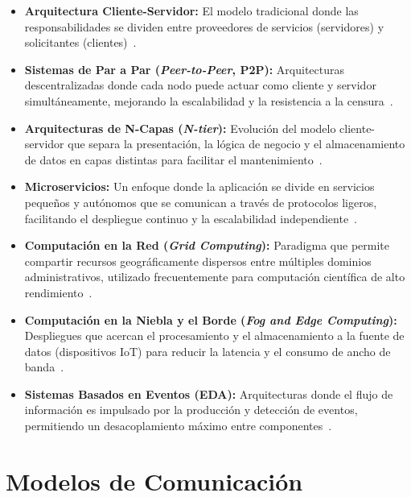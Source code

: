 \documentclass[12pt,a4paper]{article}
\begin{document}
\begin{itemize}
	\item \textbf{Arquitectura Cliente-Servidor:} El modelo tradicional donde las responsabilidades se dividen entre proveedores de servicios (servidores) y solicitantes (clientes)~\cite{r15}.

	\item \textbf{Sistemas de Par a Par (\textit{Peer-to-Peer}, P2P):} Arquitecturas descentralizadas donde cada nodo puede actuar como cliente y servidor simultáneamente, mejorando la escalabilidad y la resistencia a la censura~\cite{r15}.

	\item \textbf{Arquitecturas de N-Capas (\textit{N-tier}):} Evolución del modelo cliente-servidor que separa la presentación, la lógica de negocio y el almacenamiento de datos en capas distintas para facilitar el mantenimiento~\cite{r15}.

	\item \textbf{Microservicios:} Un enfoque donde la aplicación se divide en servicios pequeños y autónomos que se comunican a través de protocolos ligeros, facilitando el despliegue continuo y la escalabilidad independiente~\cite{r25}.

	\item \textbf{Computación en la Red (\textit{Grid Computing}):} Paradigma que permite compartir recursos geográficamente dispersos entre múltiples dominios administrativos, utilizado frecuentemente para computación científica de alto rendimiento~\cite{r26}.

	\item \textbf{Computación en la Niebla y el Borde (\textit{Fog and Edge Computing}):} Despliegues que acercan el procesamiento y el almacenamiento a la fuente de datos (dispositivos IoT) para reducir la latencia y el consumo de ancho de banda~\cite{r27}.

	\item \textbf{Sistemas Basados en Eventos (EDA):} Arquitecturas donde el flujo de información es impulsado por la producción y detección de eventos, permitiendo un desacoplamiento máximo entre componentes~\cite{r17}.
\end{itemize}

\section{Modelos de Comunicación}
\end{document}
